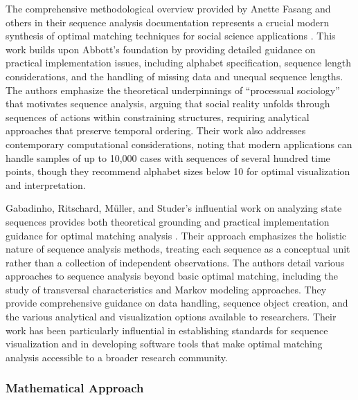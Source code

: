 \documentclass[../main.tex]{subfiles}
\begin{document}
The comprehensive methodological overview provided by Anette Fasang and others in their sequence analysis documentation represents a crucial modern synthesis of optimal matching techniques for social science applications \citep{sequence_analysis_social_science}. This work builds upon Abbott's foundation by providing detailed guidance on practical implementation issues, including alphabet specification, sequence length considerations, and the handling of missing data and unequal sequence lengths. The authors emphasize the theoretical underpinnings of ``processual sociology'' that motivates sequence analysis, arguing that social reality unfolds through sequences of actions within constraining structures, requiring analytical approaches that preserve temporal ordering. Their work also addresses contemporary computational considerations, noting that modern applications can handle samples of up to 10,000 cases with sequences of several hundred time points, though they recommend alphabet sizes below 10 for optimal visualization and interpretation.

Gabadinho, Ritschard, Müller, and Studer's influential work on analyzing state sequences provides both theoretical grounding and practical implementation guidance for optimal matching analysis \citep{traminer_documentation}. Their approach emphasizes the holistic nature of sequence analysis methods, treating each sequence as a conceptual unit rather than a collection of independent observations. The authors detail various approaches to sequence analysis beyond basic optimal matching, including the study of transversal characteristics and Markov modeling approaches. They provide comprehensive guidance on data handling, sequence object creation, and the various analytical and visualization options available to researchers. Their work has been particularly influential in establishing standards for sequence visualization and in developing software tools that make optimal matching analysis accessible to a broader research community.

\subsubsection{Mathematical Approach}
\end{document}
